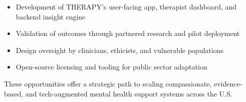 \begin{itemize}
  \item Development of THERAPY’s user-facing app, therapist dashboard, and backend insight engine
  \item Validation of outcomes through partnered research and pilot deployment
  \item Design oversight by clinicians, ethicists, and vulnerable populations
  \item Open-source licensing and tooling for public sector adaptation
\end{itemize}

\noindent These opportunities offer a strategic path to scaling compassionate, evidence-based, and tech-augmented mental health support systems across the U.S.
